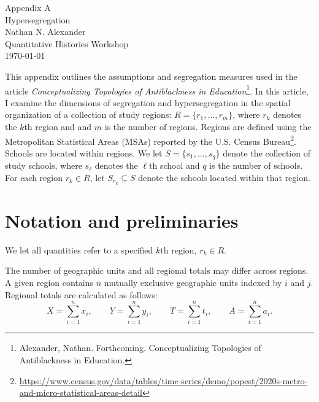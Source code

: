 \documentclass{report}[11pt,letterpaper]
\begin{document}
\begin{center}
{\Large \sc Appendix A \\ 
\medskip
Hypersegregation} \\
\vspace{.5cm}
Nathan N. Alexander \\Quantitative Histories Workshop \\ \today \\
\medskip
\end{center}
\vspace{.25cm}

\doublespace
\begingroup
    \let\clearpage\relax
    \let\cleardoublepage\relax
    \tableofcontents
\endgroup

\newpage

This appendix outlines the assumptions and segregation measures used in the article \textit{Conceptualizing Topologies of Antiblackness in Education}\footnote{Alexander, Nathan. Forthcoming. Conceptualizing Topologies of Antiblackness in Education.}. In this article, I examine the dimensions of segregation and hypersegregation in the spatial organization of a collection of study regions: $R=\{r_1,\ldots, r_m\}$, where $r_k$ denotes the $k$th region and and $m$ is the number of regions. Regions are defined using the Metropolitan Statistical Areas (MSAs) reported by the U.S. Census Bureau\footnote{\url{https://www.census.gov/data/tables/time-series/demo/popest/2020s-metro-and-micro-statistical-areas-detail}}. Schools are located within regions. We let $S=\{s_1,\ldots,s_q\}$ denote the collection of study schools, where $s_\ell$ denotes the $\ell$th school and $q$ is the number of schools. For each region $r_k \in R$, let $S_{r_k} \subseteq S$ denote the schools located within that region.


\bigskip

\section{Notation and preliminaries}

We let all quantities refer to a specified $k$th region, $r_k \in R$.  

The number of geographic units and all regional totals may differ across regions. A given region contains $n$ mutually exclusive geographic units indexed by $i$ and $j$. Regional totals are calculated as follows:
\[
X = \sum_{i=1}^{n} x_i, \qquad
Y = \sum_{i=1}^{n} y_i, \qquad
T = \sum_{i=1}^{n} t_i, \qquad
A = \sum_{i=1}^{n} a_i.
\]
\end{document}
